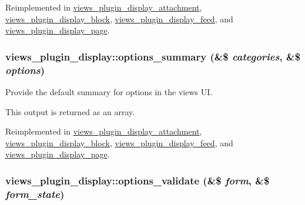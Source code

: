 Reimplemented in \hyperlink{classviews__plugin__display__attachment_63219dfd2bfed59bdf1840d704d11799}{views\_\-plugin\_\-display\_\-attachment}, \hyperlink{classviews__plugin__display__block_aac31f678cc192896bcfdeb1a8a5a2c7}{views\_\-plugin\_\-display\_\-block}, \hyperlink{classviews__plugin__display__feed_b7cca15934456ddb26045f03483899fb}{views\_\-plugin\_\-display\_\-feed}, and \hyperlink{classviews__plugin__display__page_9b03d35a15fcfcae4a474ea56b6ca5b6}{views\_\-plugin\_\-display\_\-page}.\hypertarget{classviews__plugin__display_7a2f2aeedfc14816815e3ce65a61aedf}{
\subsubsection[{options\_\-summary}]{\setlength{\rightskip}{0pt plus 5cm}views\_\-plugin\_\-display::options\_\-summary (\&\$ {\em categories}, \/  \&\$ {\em options})}}
\label{classviews__plugin__display_7a2f2aeedfc14816815e3ce65a61aedf}


Provide the default summary for options in the views UI.

This output is returned as an array. 

Reimplemented in \hyperlink{classviews__plugin__display__attachment_0d54f6bd68c3ebba7af03cd7ac722fe0}{views\_\-plugin\_\-display\_\-attachment}, \hyperlink{classviews__plugin__display__block_52bb2499272275963128bb2beb5804ce}{views\_\-plugin\_\-display\_\-block}, \hyperlink{classviews__plugin__display__feed_5c0b5faad36090985c85b16a454023a6}{views\_\-plugin\_\-display\_\-feed}, and \hyperlink{classviews__plugin__display__page_47de087f3201600b057e0d4a55eef48c}{views\_\-plugin\_\-display\_\-page}.\hypertarget{classviews__plugin__display_0b4336df4db25dec552de8d20141a9f5}{
\subsubsection[{options\_\-validate}]{\setlength{\rightskip}{0pt plus 5cm}views\_\-plugin\_\-display::options\_\-validate (\&\$ {\em form}, \/  \&\$ {\em form\_\-state})}}
\label{classviews__plugin__display_0b4336df4db25dec552de8d20141a9f5}


